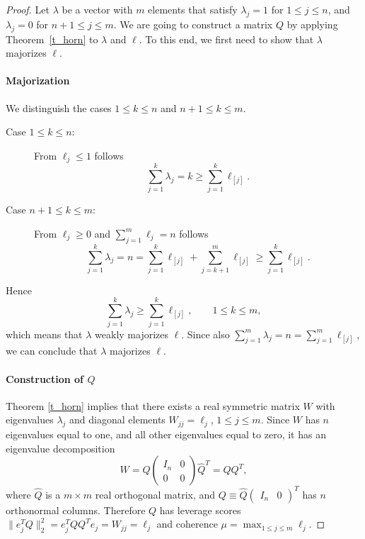 \documentclass{siamltex}
\begin{document}
\begin{proof}
Let $\lambda$ be a vector with $m$ elements that satisfy
$\lambda_j=1$ for $1\leq j\leq n$, and $\lambda_j=0$ for
$n+1\leq j\leq m$.
We are going to construct a matrix $Q$ by applying Theorem~\ref{t_horn} 
to $\lambda$ and $\ell$.
To this end, we first need to show that $\lambda$ majorizes $\ell$.

\paragraph{Majorization}
We distinguish the cases  $1\leq k\leq n$ and $n+1\leq k\leq m$.
\begin{description}
\item[Case $1\leq k\leq n$:\ ] From $\ell_j\leq 1$ follows
$$\sum_{j=1}^{k}{\lambda_j}=k\geq \sum_{j=1}^k{\ell_{[j]}}.$$
\item[Case $n+1\leq k\leq m$:\ ]
From $\ell_j\geq 0$ and $\sum_{j=1}^m{\ell_j}=n$ follows
$$\sum_{j=1}^{k}{\lambda_j}=n=\sum_{j=1}^{k}{\ell_{[j]}}  +  
\sum_{j=k+1}^{m}{\ell_{[j]}} \geq \sum_{j=1}^{k}{\ell_{[j]}}.$$
\end{description}
Hence 
$$\sum_{j=1}^{k}{\lambda_j}\geq \sum_{j=1}^k{\ell_{[j]}}, 
\qquad 1\leq k\leq m,$$
which means that $\lambda$ weakly majorizes $\ell$.
Since also $\sum_{j=1}^m{\lambda_j}=n=\sum_{j=1}^{m}{\ell_{[j]}}$,
we can conclude that $\lambda$ majorizes $\ell$.

\paragraph{Construction of $Q$}
Theorem \ref{t_horn} implies that there 
exists a real symmetric matrix $W$ with  eigenvalues
$\lambda_j$ and diagonal elements $W_{jj}=\ell_j$, $1\leq j\leq m$.
Since $W$ has $n$ eigenvalues equal to one, and all other 
eigenvalues equal to zero, it has an eigenvalue decomposition
$$W=\hat{Q}\begin{pmatrix}I_n &0\\ 0&0\end{pmatrix}\hat{Q}^T=QQ^T,$$
where $\hat{Q}$ is a $m\times m$ real orthogonal matrix, and 
$Q\equiv\hat{Q}\begin{pmatrix}I_n&0\end{pmatrix}^T$ has $n$ orthonormal
columns. Therefore $Q$ has leverage scores 
$\|e_j^TQ\|_2^2=e_j^TQQ^Te_j=W_{jj}=\ell_j$
and coherence $\mu=\max_{1\leq j\leq m}{\ell_j}$.
\end{proof}

 
 
\end{document}
